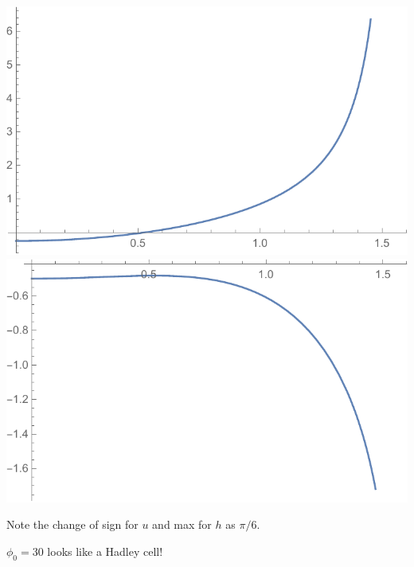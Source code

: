 \documentclass[11pt,letterpaper]{book}
\theoremstyle{definition}
\begin{document}
\begin{center}
\includegraphics[scale=0.6]{Mathematica/Hadley_cell/fig/u_30}\quad
\includegraphics[scale=0.6]{Mathematica/Hadley_cell/fig/h_30}
\end{center}
Note the change of sign for $u$ and max for $h$ as $\pi/6$. 

$\phi_0 = 30$ looks like a Hadley cell!
\end{document}
